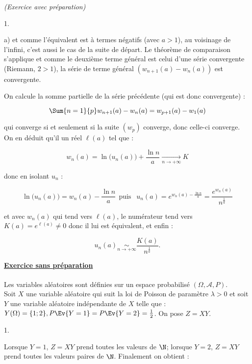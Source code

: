 \documentclass[11pt]{article}%
\begin{document}
\begin{exercice}{\it (Exercice avec préparation)}
\begin{noliste}{1.}
\begin{noliste}{a)}
 et comme l'équivalent est à termes négatifs (avec $a > 1$), au
voisinage de l'infini, c'est aussi le cas de la suite de départ. Le
théorème de comparaison s'applique et comme le deuxième terme général
est celui d'une série convergente (Riemann, $2> 1$), la série de terme
général $(w_{n + 1} (a) - w_{n} (a) )$ est convergente. \\

 \item On calcule la somme partielle de la série précédente (qui est
donc convergente) : 
 
\[
 \Sum{n = 1}{p} w_{n + 1} (a) - w_{n} (a) = w_{p + 1} (a) - w_{1} (a) 
\]

 qui converge si et seulement si la suite $(w_{p})$ converge, donc
celle-ci converge. \\

 On en déduit qu'il un réel $\ell (a)$ tel que : 
 
\[
 w_{n} (a) = \ln \big( u_{n} (a) \big) + \frac{ \ln n }{ a }
\xrightarrow[ n \rightarrow + \infty ]{} K 
\]

 donc en isolant $u_{n}$ : 
 
\[
 \ln \big( u_{n} (a) \big) = w_{n} (a)- \frac{ \ln n }{ a } \ \ \text{
puis } \ \ u_{n} (a) = e^{ w_{n} (a)- \frac{ \ln n }{ a } } = \frac{
e^{ w_{n} (a) } }{ n^{ \frac{1}{a} } } 
\]

 et avec $w_{n}(a)$ qui tend vers $\ell (a)$, le numérateur tend vers
$K (a) = e^{ \ell (a ) } \neq 0$ donc il lui est équivalent, et enfin :

 
\[
 u_{n} (a) \underset{ n \rightarrow + \infty }{ \sim } \frac{ K(a) }{
n^{ \frac{1}{a} } }. 
\]

 \end{noliste}

 \end{noliste}

 \noindent \textbf{\underline{Exercice sans préparation}} \\
\\
 Les variables aléatoires sont définies sur un espace probabilisé
$(\Omega, \mathcal{A}, P)$. \\
 Soit $X$ une variable aléatoire qui suit la loi de Poisson de
paramètre $\lambda > 0$ et soit $Y$ une variable aléatoire indépendante
de $X$ telle que : $ Y ( \Omega ) = \{ 1 ; 2 \}, P \Ev{ Y = 1 } = P
\Ev{ Y = 2 } = \frac{ 1 }{ 2 }$. On pose $Z = X Y$.
 \begin{noliste}{1.}
 \setlength{\itemsep}{4mm}

 \item Lorsque $Y = 1$, $Z = X Y$ prend toutes les valeurs de $\N$;
lorsque $Y = 2$, $Z = X Y$ prend toutes les valeurs paires de $\N$.
Finalement on obtient : 
 

\end{noliste}
\end{exercice}
\end{document}
